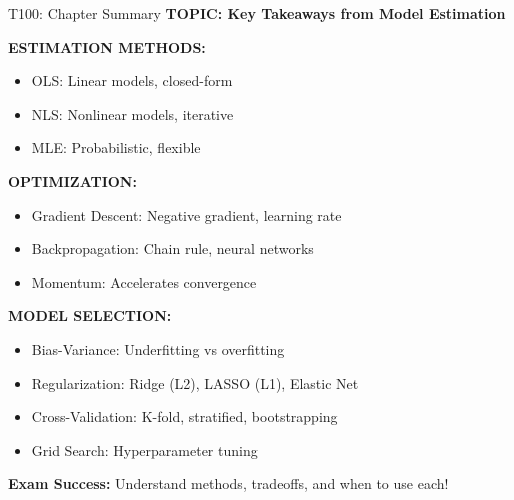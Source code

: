 \documentclass[8pt]{beamer}
\begin{document}
	\begin{frame}{T100: Chapter Summary}
		\fontsize{6.5}{7.5}\selectfont
		\textbf{TOPIC: Key Takeaways from Model Estimation}
		
		\vspace{0.1cm}
		\textbf{ESTIMATION METHODS:}
		\begin{itemize}
			\item \textcolor{myblue}{OLS:} Linear models, closed-form
			\item \textcolor{myblue}{NLS:} Nonlinear models, iterative
			\item \textcolor{myblue}{MLE:} Probabilistic, flexible
		\end{itemize}
		
		\vspace{0.1cm}
		\textbf{OPTIMIZATION:}
		\begin{itemize}
			\item \textcolor{myblue}{Gradient Descent:} Negative gradient, learning rate
			\item \textcolor{myblue}{Backpropagation:} Chain rule, neural networks
			\item \textcolor{myblue}{Momentum:} Accelerates convergence
		\end{itemize}
		
		\vspace{0.1cm}
		\textbf{MODEL SELECTION:}
		\begin{itemize}
			\item \textcolor{myblue}{Bias-Variance:} Underfitting vs overfitting
			\item \textcolor{myblue}{Regularization:} Ridge (L2), LASSO (L1), Elastic Net
			\item \textcolor{myblue}{Cross-Validation:} K-fold, stratified, bootstrapping
			\item \textcolor{myblue}{Grid Search:} Hyperparameter tuning
		\end{itemize}
		
		\vspace{0.1cm}
		\textcolor{myred}{\textbf{Exam Success:}} Understand methods, tradeoffs, and when to use each!
	\end{frame}
	
\end{document}
